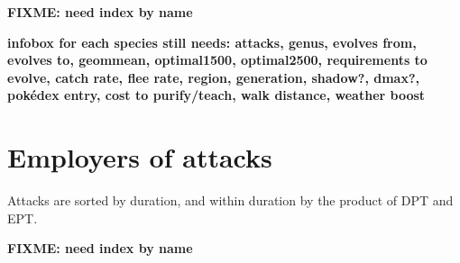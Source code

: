 \documentclass[ebook,10pt,openany,onesided]{memoir}
\begin{document}
\textbf{FIXME: need index by name}

\textbf{infobox for each species still needs: attacks, genus, evolves from, evolves to, geommean, optimal1500, optimal2500,
           requirements to evolve, catch rate, flee rate, region, generation, shadow?, dmax?,
           pokédex entry, cost to purify/teach, walk distance, weather boost}

\chapter{Employers of attacks}
Attacks are sorted by duration, and within duration by the product of DPT and EPT.

\textbf{FIXME: need index by name}
\end{document}
